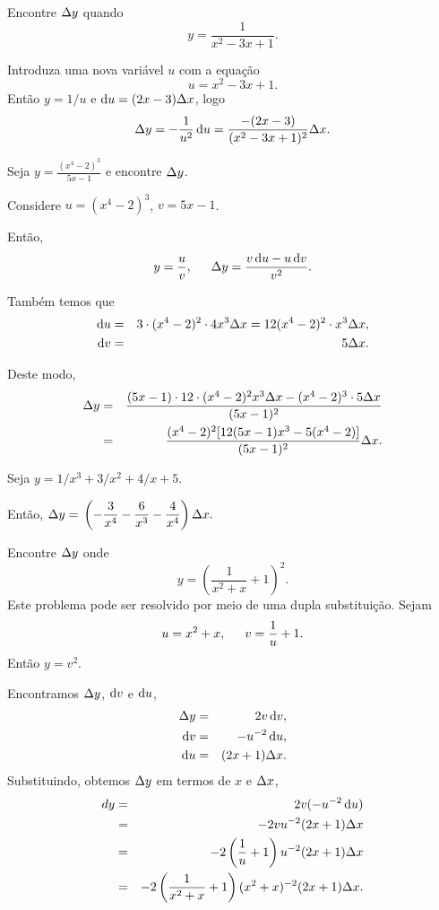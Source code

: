 \begin{example} Encontre $\Delta{y}$ quando
$$
  y = \frac{1}{x^2 - 3x + 1}.
$$

Introduza uma nova variável $u$ com a equação
$$
  u = x^2 - 3x + 1.
$$
Então $y = 1/u$ e $\du = (2x - 3) \dx$, logo
$$
  \dy = -\frac{1}{u^2} \du = \frac{-(2x - 3)}{(x^2 - 3x + 1)^2} \dx.
$$
\end{example}

\begin{example}
Seja $\displaystyle y = \frac{(x^4 - 2)^3}{5x - 1}$ e encontre $\Delta{y}$.

Considere $u = (x^4 - 2)^3$, \hspace{1.5em} $v = 5x - 1$.

Então,
$$
  y = \frac{u}{v}, \hspace{1.5em} \dy = \frac{v \du - u \dv}{v^2}.
$$

Também temos que
\begin{eqnarray*}
  \du & = & 3 \cdot (x^4 - 2)^2 \cdot 4x^3 \dx = 12(x^4 - 2)^2 \cdot x^3 \dx, \\
  \dv & = & 5 \dx.
\end{eqnarray*}

Deste modo,
\begin{eqnarray*}
  \Delta{y} & = & \frac{(5x - 1) \cdot 12 \cdot (x^4 - 2)^2 x^3 \Delta{x} -
                  (x^4-2)^3 \cdot 5 \Delta{x}}{(5x-1)^2} \\
  & = & \frac{(x^4-2)^2[12(5x-1)x^3-5(x^4-2)]}{(5x-1)^2} \Delta{x}.
\end{eqnarray*}
\end{example}

\begin{example}
Seja $y = 1/x^3 + 3/x^2 + 4/x + 5$.

Então, \hspace{1.5em} $\Delta{y} = \mathstrut\left( -\dfrac{3}{x^4} - \dfrac{6}{x^3} - \dfrac{4}{x^4} \right) \Delta{x}.$
\end{example}

\begin{example}
Encontre $\Delta{y}$ onde
$$
  y = \left( \frac{1}{x^2+ x} + 1 \right)^2.
$$
Este problema pode ser resolvido por meio de uma dupla substituição. Sejam
$$
  u = x^2 + x, \hspace{1.5em} v = \frac{1}{u} + 1.
$$
Então \hspace{1.5em} $y = v^2$.

Encontramos $\Delta{y}$, $\dv$ e $\du$,
\begin{eqnarray*}
  \dy & = & 2v \dv, \\
  \dv & = & -u^{-2} \du, \\
  \du & = & (2x+1) \dx.
\end{eqnarray*}
Substituindo, obtemos $\Delta{y}$ em termos de $x$ e $\Delta{x}$,
\begin{eqnarray*}
  dy & = & 2v(-u^{-2} \du) \\
  & = & -2vu^{-2}(2x+1) \dx \\
  & = & -2 \left(\frac{1}{u} + 1\right) u^{-2} (2x+1) \dx \\
  & = & -2 \left(\frac{1}{x^2+x} + 1\right)(x^2 + x)^{-2}(2x+1)\dx.
\end{eqnarray*}
\end{example}

